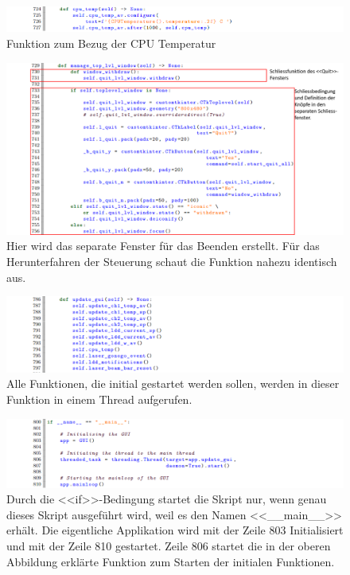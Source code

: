 \begin{appendix}
\begin{landscape}
\begin{figure}[H]
    \centering
    \includegraphics[scale=0.8]{98_images/src/fhnw_pro6m_quellcode_22.png}
    \caption*{Funktion zum Bezug der CPU Temperatur}
    \label{fig:fhnw_pro6m_quellcode_22}
\end{figure}

\begin{figure}[H]
    \centering
    \includegraphics[scale=0.8]{98_images/src/fhnw_pro6m_quellcode_23.png}
    \caption*{Hier wird das separate Fenster für das Beenden erstellt. Für das Herunterfahren der Steuerung schaut die Funktion nahezu identisch aus.}
    \label{fig:fhnw_pro6m_quellcode_23}
\end{figure}

\begin{figure}[H]
    \centering
    \includegraphics[scale=0.8]{98_images/src/fhnw_pro6m_quellcode_24.png}
    \caption*{Alle Funktionen, die initial gestartet werden sollen, werden in dieser Funktion in einem Thread aufgerufen.}
    \label{fig:fhnw_pro6m_quellcode_24}
\end{figure}

\begin{figure}[H]
    \centering
    \includegraphics[scale=0.8]{98_images/src/fhnw_pro6m_quellcode_25.png}
    \caption*{Durch die <<if>>-Bedingung startet die Skript nur, wenn genau dieses Skript ausgeführt wird, weil es den Namen <<\_\_main\_\_>> erhält. Die eigentliche Applikation wird mit der Zeile 803 Initialisiert und mit der Zeile 810 gestartet. Zeile 806 startet die in der oberen Abbildung erklärte Funktion zum Starten der initialen Funktionen.}
    \label{fig:fhnw_pro6m_quellcode_25}
\end{figure} 


\end{landscape}
\end{appendix}
